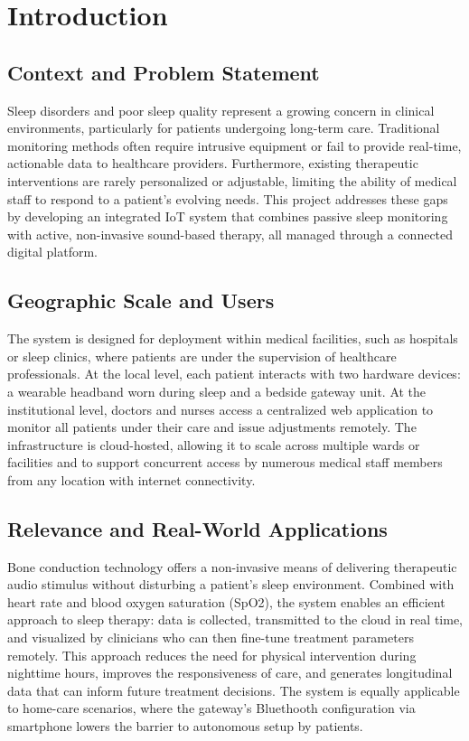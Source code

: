 \section{Introduction}
\label{sec:introduction}

\subsection{Context and Problem Statement}

Sleep disorders and poor sleep quality represent a growing concern in clinical environments,
particularly for patients undergoing long-term care. Traditional monitoring methods often
require intrusive equipment or fail to provide real-time, actionable data to healthcare
providers. Furthermore, existing therapeutic interventions are rarely personalized or adjustable, limiting the ability of medical staff to respond to a
patient's evolving needs. This project addresses these gaps by developing an integrated
IoT system that combines passive sleep monitoring with active, non-invasive sound-based
therapy, all managed through a connected digital platform.

\subsection{Geographic Scale and Users}

The system is designed for deployment within medical facilities, such as hospitals or
sleep clinics, where patients are under the supervision of healthcare professionals.
At the local level, each patient interacts with two hardware devices: a wearable headband
worn during sleep and a bedside gateway unit. At the institutional level, doctors and
nurses access a centralized web application to monitor all patients under their care and
issue adjustments remotely. The infrastructure is cloud-hosted, allowing it
to scale across multiple wards or facilities and to support concurrent access by numerous
medical staff members from any location with internet connectivity.

\subsection{Relevance and Real-World Applications}

Bone conduction technology offers a non-invasive means of delivering therapeutic audio
stimulus without disturbing a patient's sleep environment. Combined with
heart rate and blood oxygen saturation (SpO2), the system
enables an efficient approach to sleep therapy: data is collected, transmitted to the
cloud in real time, and visualized by clinicians who can then fine-tune treatment
parameters remotely. This approach reduces the need for physical intervention during
nighttime hours, improves the responsiveness of care, and generates longitudinal data
that can inform future treatment decisions. The system is equally applicable to home-care
scenarios, where the gateway's Bluethooth configuration via smartphone lowers the barrier to
autonomous setup by patients.

